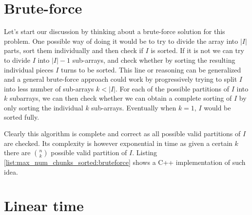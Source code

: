 \section{Brute-force}
\label{max_num_chunks_sorted:sec:bruteforce}


Let's start our discussion by thinking about a brute-force solution for this problem. 
One possible way of doing it would be to try to divide the array into $|I|$ parts, 
sort  them individually and then check if $I$ is sorted. 
If it is not we can try to divide $I$ into $|I|-1$ sub-arrays,
and check whether by sorting the resulting individual pieces $I$ turns to be sorted.
This line or reasoning can be generalized and a general brute-force approach
could work by progressively trying to split $I$ into less number of sub-arrays $k <|I|$.
For each of the possible  partitions of $I$ into $k$ subarrays, we can then check whether 
we can obtain a complete sorting of $I$ by only sorting the individual $k$ sub-arrays.
Eventually when $k=1$, $I$ would be sorted fully.

Clearly this algorithm is complete and correct
as all possible valid partitions of $I$ are checked. Its complexity is however exponential
in time as given a certain $k$ there are ${n \choose k} $ possible valid partition of $I$. 
Listing \ref{list:max_num_chunks_sorted:bruteforce} shows a C++ implementation of such idea. 


\begin{minipage}{\linewidth}
	
\end{minipage}


\section{Linear time}
\label{max_num_chunks_sorted:sec:lineartime}

\begin{minipage}{\linewidth}
	
\end{minipage}
